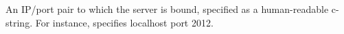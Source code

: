 An IP/port pair to which the server is bound, specified as a human-readable
c-string.  For instance,  specifies localhost port 2012.
